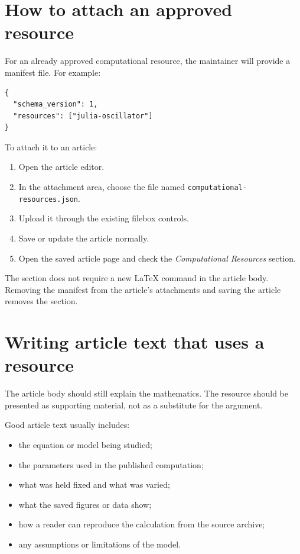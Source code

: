\section{How to attach an approved resource}

For an already approved computational resource, the maintainer will provide a
manifest file.  For example:
\begin{verbatim}
{
  "schema_version": 1,
  "resources": ["julia-oscillator"]
}
\end{verbatim}

To attach it to an article:
\begin{enumerate}
\item Open the article editor.
\item In the attachment area, choose the file named
      \texttt{computational-resources.json}.
\item Upload it through the existing filebox controls.
\item Save or update the article normally.
\item Open the saved article page and check the \emph{Computational Resources}
      section.
\end{enumerate}

The section does not require a new LaTeX command in the article body.  Removing
the manifest from the article's attachments and saving the article removes the
section.

\section{Writing article text that uses a resource}

The article body should still explain the mathematics.  The resource should be
presented as supporting material, not as a substitute for the argument.

Good article text usually includes:
\begin{itemize}
\item the equation or model being studied;
\item the parameters used in the published computation;
\item what was held fixed and what was varied;
\item what the saved figures or data show;
\item how a reader can reproduce the calculation from the source archive;
\item any assumptions or limitations of the model.
\end{itemize}

